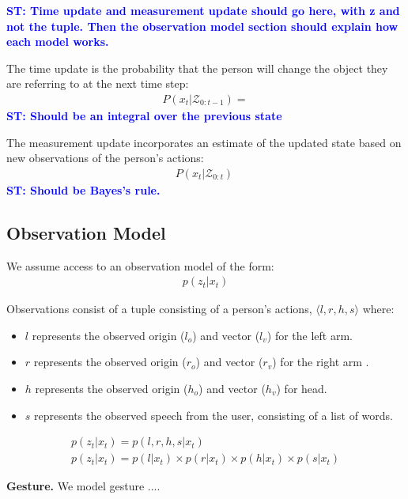 \documentclass[letterpaper, 10 pt, conference]{ieeeconf}
\newcommand{\stnote}[1]{\textcolor{Blue}{\textbf{ST: #1}}}
\begin{document}
\stnote{Time update and measurement update should go here, with z and
  not the tuple.  Then the observation model section should explain
  how each model works.}



The time update is the probability that the person will change the
object they are referring to at the next time step:
\begin{align}
P(x_t | \mathcal{Z}_{0:t-1}) = 
\end{align}
\stnote{Should be an integral over the previous state}


The measurement update incorporates an estimate of the updated state
based on new observations of the person's actions: 
\begin{align}
P(x_t | \mathcal{Z}_{0:t}) \
\end{align}
\stnote{Should be Bayes's rule.}





\subsection{Observation Model}

We assume access to an observation model of the form:
\begin{align}
p(z_t | x_t)
\end{align}

Observations consist of a tuple consisting of a person's actions,
$\langle l, r, h, s\rangle $ where:
\begin{itemize}
	\item $l$ represents the observed origin ($l_o$) and vector ($l_v$) for the left arm.
	\item $r$ represents the observed origin  ($r_o$) and vector ($r_v$)  for the right arm .
	\item $h$ represents the observed origin  ($h_o$) and vector ($h_v$)  for head.
	\item $s$ represents the observed speech from the user, consisting of a list of words.
	\end{itemize}

\begin{align}
p(z_t | x_t) = p(l, r, h, s | x_t)\\
p(z_t | x_t) = p(l | x_t) \times p(r | x_t) \times p(h | x_t) \times p(s | x_t)
\end{align}

{\bf Gesture.}  We model gesture ....
\end{document}
